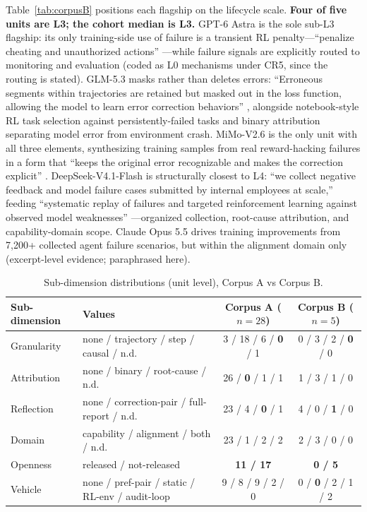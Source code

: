 \documentclass[10pt]{article}
\begin{document}
Table~\ref{tab:corpusB} positions each flagship on the lifecycle scale. \textbf{Four of five units are L3; the cohort median is L3.} GPT-6 Astra is the sole sub-L3 flagship: its only training-side use of failure is a transient RL penalty---``penalize cheating and unauthorized actions'' \cite{openai2026gpt6}---while failure signals are explicitly routed to monitoring and evaluation (coded as L0 mechanisms under CR5, since the routing is stated). GLM-5.3 masks rather than deletes errors: ``Erroneous segments within trajectories are retained but masked out in the loss function, allowing the model to learn error correction behaviors'' \cite{zai2026glm5}, alongside notebook-style RL task selection against persistently-failed tasks and binary attribution separating model error from environment crash. MiMo-V2.6 is the only unit with all three elements, synthesizing training samples from real reward-hacking failures in a form that ``keeps the original error recognizable and makes the correction explicit'' \cite{xiaomi2026mimo}. DeepSeek-V4.1-Flash is structurally closest to L4: ``we collect negative feedback and model failure cases submitted by internal employees at scale,'' feeding ``systematic replay of failures and targeted reinforcement learning against observed model weaknesses'' \cite{deepseek2026v41}---organized collection, root-cause attribution, and capability-domain scope. Claude Opus 5.5 drives training improvements from 7,200+ collected agent failure scenarios, but within the alignment domain only \cite{anthropic2026claude} (excerpt-level evidence; paraphrased here).

\begin{table}[t]
\centering
\caption{Sub-dimension distributions (unit level), Corpus A vs Corpus B.}
\label{tab:subdims}
\small
\begin{tabular}{llcc}
\toprule
Sub-dimension & Values & Corpus A ($n{=}28$) & Corpus B ($n{=}5$) \\
\midrule
Granularity & none / trajectory / step / causal / n.d. & 3 / 18 / 6 / \textbf{0} / 1 & 0 / 3 / 2 / \textbf{0} / 0 \\
Attribution & none / binary / root-cause / n.d. & 26 / \textbf{0} / 1 / 1 & 1 / 3 / 1 / 0 \\
Reflection & none / correction-pair / full-report / n.d. & 23 / 4 / \textbf{0} / 1 & 4 / 0 / \textbf{1} / 0 \\
Domain & capability / alignment / both / n.d. & 23 / 1 / 2 / 2 & 2 / 3 / 0 / 0 \\
Openness & released / not-released & \textbf{11 / 17} & \textbf{0 / 5} \\
Vehicle & none / pref-pair / static / RL-env / audit-loop & 9 / 8 / 9 / 2 / 0 & 0 / \textbf{0} / 2 / 1 / 2 \\
\bottomrule
\end{tabular}
\end{table}
\end{document}
